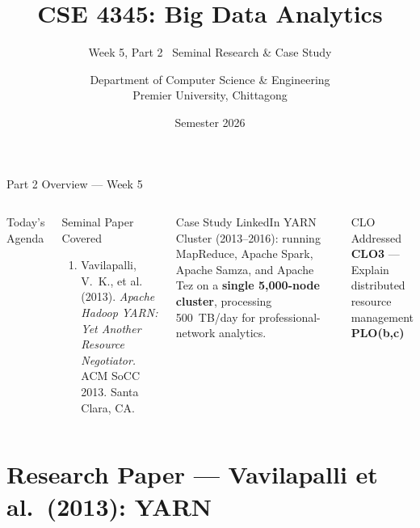 \documentclass[aspectratio=169,10pt]{beamer}
\title[CSE 4345 \textbar{} Week 5, Part 2]{CSE 4345: Big Data Analytics}
\subtitle{Week 5, Part 2 \textemdash\ Seminal Research \& Case Study}
\author[Dept.\ of CSE]{Department of Computer Science \& Engineering\\[4pt]
       \small Premier University, Chittagong}
\institute{}
\date{Semester 2026}
\begin{document}

\begin{frame}
  \titlepage
\end{frame}

\begin{frame}{Part 2 Overview — Week 5}
  \begin{columns}[T]
      \begin{block}{Today's Agenda}
        \tableofcontents
      \end{block}

      \begin{exampleblock}{Seminal Paper Covered}
        \begin{enumerate}
          \item Vavilapalli, V.~K., et al. (2013).
                \textit{Apache Hadoop YARN: Yet Another Resource
                Negotiator.} ACM SoCC 2013. Santa Clara, CA.
        \end{enumerate}
      \end{exampleblock}
      \vspace{6pt}
      \begin{alertblock}{Case Study}
        LinkedIn YARN Cluster (2013--2016): running MapReduce,
        Apache Spark, Apache Samza, and Apache Tez on a
        \textbf{single 5{,}000-node cluster}, processing
        500~TB/day for professional-network analytics.
      \end{alertblock}
      \vspace{4pt}
      \begin{block}{CLO Addressed}
        \textbf{CLO3} — Explain distributed resource management\\
        \textbf{PLO(b,c)}
      \end{block}
  \end{columns}
\end{frame}

\section{Research Paper — Vavilapalli et al.\ (2013): YARN}
\end{document}
